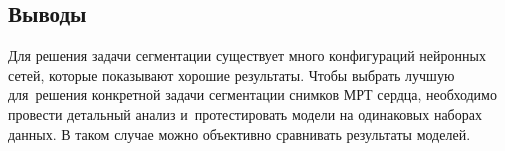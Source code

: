 \subsection{Выводы}

Для решения задачи сегментации существует много конфигураций нейронных сетей, 
которые показывают хорошие результаты. Чтобы выбрать лучшую для~решения конкретной 
задачи сегментации снимков МРТ сердца, необходимо провести детальный анализ 
и~протестировать модели на одинаковых наборах данных. В таком случае можно 
объективно сравнивать результаты моделей.
